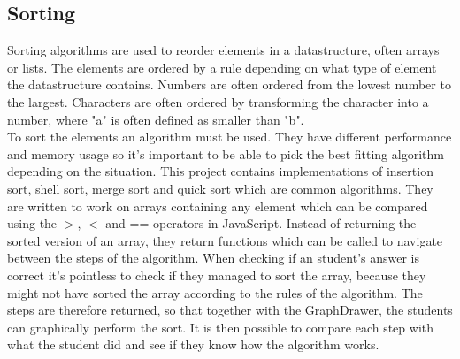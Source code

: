 \subsection{Sorting}
Sorting algorithms are used to reorder elements in a datastructure, often arrays or lists. The elements are ordered by a rule depending on what type of element the datastructure contains. Numbers are often ordered from the lowest number to the largest. Characters are often ordered by transforming the character into a number, where "a" is often defined as smaller than "b".
\\[11pt]
To sort the elements an algorithm must be used. They have different performance and memory usage so it's important to be able to pick the best fitting algorithm depending on the situation. This project contains implementations of insertion sort, shell sort, merge sort and quick sort which are common algorithms. They are written to work on arrays containing any element which can be compared using the $>$, $<$ and == operators in JavaScript. Instead of returning the sorted version of an array, they return functions which can be called to navigate between the steps of the algorithm. When checking if an student's answer is correct it's pointless to check if they managed to sort the array, because they might not have sorted the array according to the rules of the algorithm. The steps are therefore returned, so that together with the GraphDrawer, the students can graphically perform the sort. It is then possible to compare each step with what the student did and see if they know how the algorithm works.






